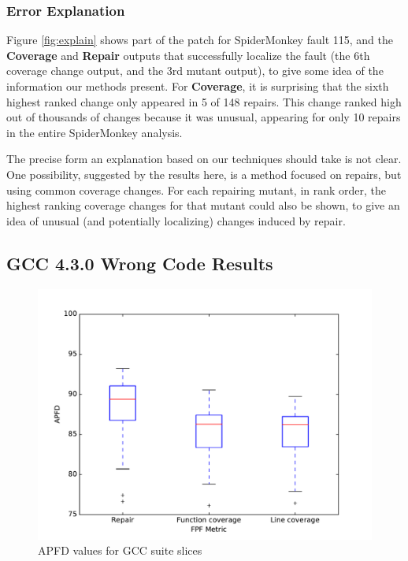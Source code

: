 \subsubsection{Error Explanation}


Figure \ref{fig:explain} shows part of the patch for SpiderMonkey fault 115, and the {\bf Coverage} and {\bf Repair} outputs that successfully localize the fault (the 6th coverage change output, and the 3rd mutant output), to give some idea of the information our methods present.  For {\bf Coverage}, it is surprising that the sixth highest ranked change only appeared in 5 of 148 repairs. This change ranked high out of thousands of changes because it was unusual, appearing for only 10 repairs in the entire SpiderMonkey analysis. 

The precise form an explanation based on our techniques should take is not clear.  One possibility, suggested by the results here, is a method focused on repairs, but using common coverage changes.  For each repairing mutant, in rank order, the highest ranking coverage changes for that mutant could also be shown, to give an idea of unusual (and potentially localizing) changes induced by repair.


\subsection{GCC 4.3.0 Wrong Code Results}


\begin{figure}
  \centering
  \includegraphics[width=\columnwidth]{comparegcc}
  \caption{APFD values for GCC suite slices}
  \label{comparegcc}
\end{figure}%

